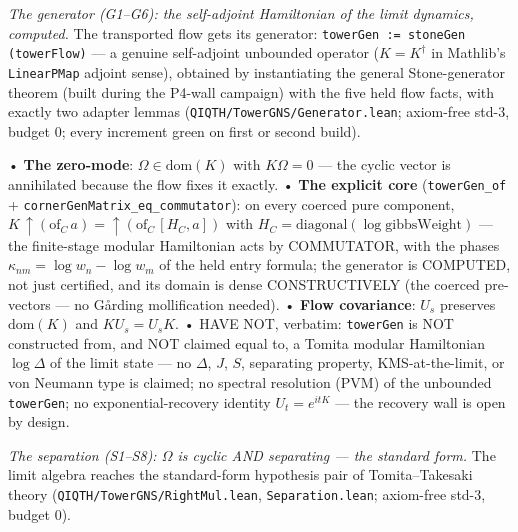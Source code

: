 \documentclass[11pt,a4paper]{article}
\begin{document}
\emph{The generator (G1--G6): the self-adjoint Hamiltonian of the limit dynamics, computed.} The transported flow gets its generator: \texttt{towerGen := stoneGen (towerFlow)} — a genuine self-adjoint unbounded operator ($K = K^\dagger$ in Mathlib's \texttt{LinearPMap} adjoint sense), obtained by instantiating the general Stone-generator theorem (built during the P4-wall campaign) with the five held flow facts, with exactly two adapter lemmas (\texttt{QIQTH/TowerGNS/Generator.lean}; axiom-free std-3, budget 0; every increment green on first or second build).

  • \textbf{The zero-mode}: $\Omega \in \mathrm{dom}(K)$ with $K\Omega = 0$ — the cyclic vector is annihilated because the flow fixes it exactly.
  • \textbf{The explicit core} (\texttt{towerGen\_of} + \texttt{cornerGenMatrix\_eq\_commutator}): on every coerced pure component, $K\,\uparrow\!(\mathrm{of}_C\,a) = \uparrow\!(\mathrm{of}_C\,[H_C, a])$ with $H_C = \mathrm{diagonal}(\log \mathrm{gibbsWeight})$ — the finite-stage modular Hamiltonian acts by COMMUTATOR, with the phases $\kappa_{nm} = \log w_n - \log w_m$ of the held entry formula; the generator is COMPUTED, not just certified, and its domain is dense CONSTRUCTIVELY (the coerced pre-vectors — no Gårding mollification needed).
  • \textbf{Flow covariance}: $U_s$ preserves $\mathrm{dom}(K)$ and $K U_s = U_s K$.
  • HAVE NOT, verbatim: \texttt{towerGen} is NOT constructed from, and NOT claimed equal to, a Tomita modular Hamiltonian $\log \Delta$ of the limit state — no $\Delta$, $J$, $S$, separating property, KMS-at-the-limit, or von Neumann type is claimed; no spectral resolution (PVM) of the unbounded \texttt{towerGen}; no exponential-recovery identity $U_t = e^{itK}$ — the recovery wall is open by design.

\emph{The separation (S1--S8): $\Omega$ is cyclic AND separating — the standard form.} The limit algebra reaches the standard-form hypothesis pair of Tomita--Takesaki theory (\texttt{QIQTH/TowerGNS/RightMul.lean}, \texttt{Separation.lean}; axiom-free std-3, budget 0).
\end{document}
